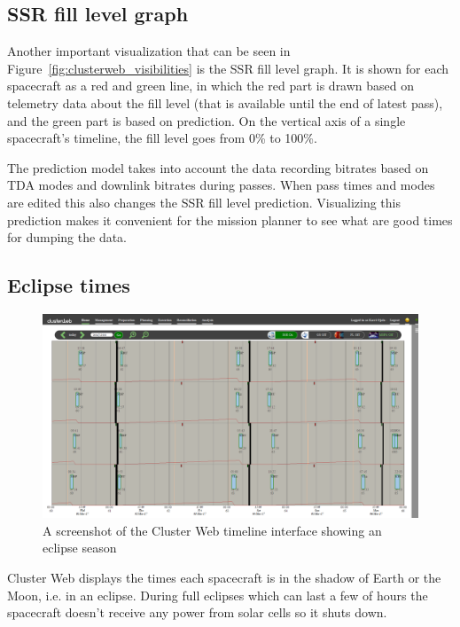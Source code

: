 \subsection{SSR fill level graph}
Another important visualization that can be seen in Figure~\ref{fig:clusterweb_visibilities} is the SSR fill level graph. It is shown for each spacecraft as a red and green line, in which the red part is drawn based on telemetry data about the fill level (that is available until the end of latest pass), and the green part is based on prediction. On the vertical axis of a single spacecraft's timeline, the fill level goes from 0\% to 100\%.

The prediction model takes into account the data recording bitrates based on TDA modes and downlink bitrates during passes. When pass times and modes are edited this also changes the SSR fill level prediction. Visualizing this prediction makes it convenient for the mission planner to see what are good times for dumping the data.

\subsection{Eclipse times}

\begin{figure}[ht]
  \begin{center}
    \includegraphics*[width=1\textwidth]{clusterweb_eclipses}
  \end{center}
  \caption{A screenshot of the Cluster Web timeline interface showing an eclipse season}
  \label{fig:clusterweb_eclipses}
\end{figure}

Cluster Web displays the times each spacecraft is in the shadow of Earth or the Moon, i.e. in an eclipse. During full eclipses which can last a few of hours the spacecraft doesn't receive any power from solar cells so it shuts down.


